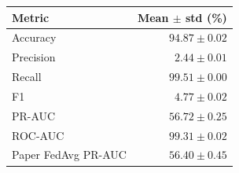 \begin{tabular}{lr}
\toprule
Metric & Mean $\pm$ std (\%) \\
\midrule
Accuracy & $94.87 \pm 0.02$ \\
Precision & $2.44 \pm 0.01$ \\
Recall & $99.51 \pm 0.00$ \\
F1 & $4.77 \pm 0.02$ \\
PR-AUC & $56.72 \pm 0.25$ \\
ROC-AUC & $99.31 \pm 0.02$ \\
\midrule
Paper FedAvg PR-AUC & $56.40 \pm 0.45$ \\
\bottomrule
\end{tabular}